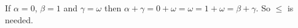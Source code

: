 \begin{enumerate}
If \(\alpha=0\), \(\beta=1\) and \(\gamma=\omega\)
then \(\alpha+\gamma = 0+\omega = \omega = 1 + \omega = \beta+\gamma\).
So \(\leq\) is needed.

\unfinished

\begin{excopy}
\end{excopy}
\unfinished


\end{enumerate}

